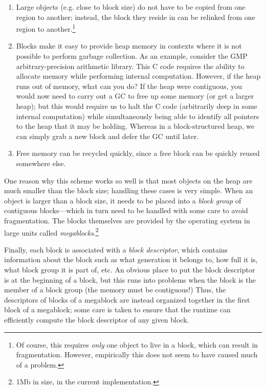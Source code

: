 \begin{enumerate}
    \item Large objects (e.g. close to block size) do not have to be copied from one region to
        another; instead, the block they reside in can be relinked from
        one region to another.\footnote{Of course, this requires \emph{only}
        one object to live in a block, which can result in fragmentation.
        However, empirically this does not seem to have caused much of a problem.}
    \item Blocks make it easy to provide heap memory in contexts where it is
        not possible to perform garbage collection.  As an example, consider
        the GMP arbitrary-precision arithmetic library.  This C code requires
        the ability to allocate memory while performing internal computation.
        However, if the heap runs out of memory, what can you do?  If the heap
        were contiguous, you would now need to carry out a GC to free up some memory
        (or get a larger heap); but this would require us to halt the C code
        (arbitrarily deep in some internal computation) while simultaneously being
        able to identify all pointers to the heap that it may be holding.  Whereas
        in a block-structured heap, we can simply grab a new block and defer the GC
        until later.
    \item Free memory can be recycled quickly, since a free block can be quickly
        reused somewhere else.
\end{enumerate}

One reason why this scheme works so well is that most objects on the
heap are much smaller than the block size; handling these cases is very
simple.  When an object is larger than a block size, it needs to be
placed into a \emph{block group} of contiguous blocks---which in turn
need to be handled with some care to avoid fragmentation.  The blocks
themselves are provided by the operating system in large units called
\emph{megablocks}.\footnote{1Mb in size, in the current implementation.}

Finally, each block is associated with a \emph{block descriptor}, which
contains information about the block such as what generation it belongs to, how full it is, what block
group it is part of, etc.  An obvious place to put the block descriptor
is at the beginning of a block, but this runs into problems when the block
is the member of a block group (the memory must be contiguous!)
Thus, the descriptors of blocks of a megablock are instead organized together
in the first block of a megablock; some care is taken to ensure that the
runtime can efficiently compute the block descriptor of any given block.

